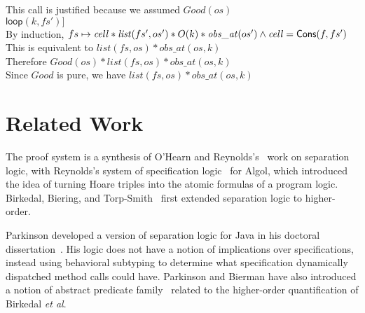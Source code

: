 \begin{tabbedproof}
\ooo This call is justified because we assumed $\mathit{Good}(os)$ \\
\ooo $\mathsf{loop}(k, fs')]$\\
\ooo By induction, $fs \mapsto \mathit{cell}  * \mathit{list}(fs',  os') * O(k) * \mathit{obs\_at}( os') \land \mathit{cell} = \mathsf{Cons}(f, fs')$ \\
\ooo This is equivalent to $\mathit{list}(fs, os) * \mathit{obs\_at}(os, k)$ \\
\oo Therefore $\mathit{Good}(os) * \mathit{list}(fs, os) * \mathit{obs\_at}(os, k)$ \\
\oo Since $\mathit{Good}$ is pure, we have $\mathit{list}(fs, os) * \mathit{obs\_at}(os, k)$ \\
\end{tabbedproof}


% 

\section{Related Work}
The proof system is a synthesis of O'Hearn and
Reynolds's~\cite{sep-logic} work on separation logic, with Reynolds's
system of specification logic~\cite{spec-logic} for Algol, which
introduced the idea of turning Hoare triples into the atomic formulas
of a program logic. Birkedal, Biering, and Torp-Smith~\cite{hosl}
first extended separation logic to higher-order.

Parkinson developed a version of separation logic for Java in his
doctoral dissertation~\cite{parkinson-thesis}. His logic does not have
a notion of implications over specifications, instead using behavioral
subtyping to determine what specification dynamically dispatched
method calls could have. Parkinson and Bierman have also introduced a
notion of abstract predicate family~\cite{parkinson-bierman-05}
related to the higher-order quantification of Birkedal \emph{et al}.


